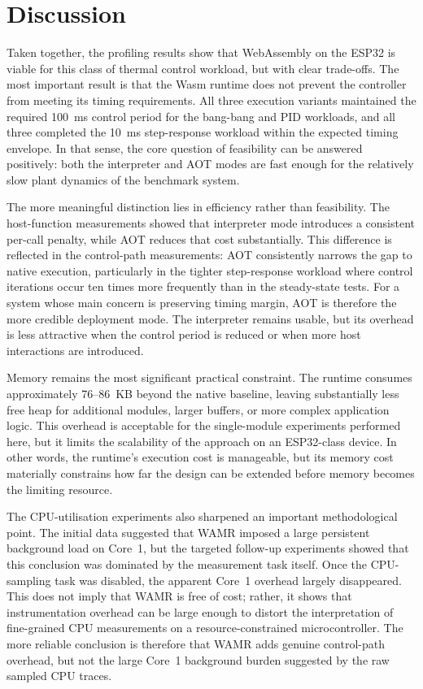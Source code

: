 \documentclass[12pt, a4paper]{report}
\begin{document}
\section{Discussion}

Taken together, the profiling results show that WebAssembly on the ESP32 is viable for this class of thermal control workload, but with clear trade-offs. The most important result is that the Wasm runtime does not prevent the controller from meeting its timing requirements. All three execution variants maintained the required 100~ms control period for the bang-bang and PID workloads, and all three completed the 10~ms step-response workload within the expected timing envelope. In that sense, the core question of feasibility can be answered positively: both the interpreter and AOT modes are fast enough for the relatively slow plant dynamics of the benchmark system.

The more meaningful distinction lies in efficiency rather than feasibility. The host-function measurements showed that interpreter mode introduces a consistent per-call penalty, while AOT reduces that cost substantially. This difference is reflected in the control-path measurements: AOT consistently narrows the gap to native execution, particularly in the tighter step-response workload where control iterations occur ten times more frequently than in the steady-state tests. For a system whose main concern is preserving timing margin, AOT is therefore the more credible deployment mode. The interpreter remains usable, but its overhead is less attractive when the control period is reduced or when more host interactions are introduced.

Memory remains the most significant practical constraint. The runtime consumes approximately 76--86~KB beyond the native baseline, leaving substantially less free heap for additional modules, larger buffers, or more complex application logic. This overhead is acceptable for the single-module experiments performed here, but it limits the scalability of the approach on an ESP32-class device. In other words, the runtime's execution cost is manageable, but its memory cost materially constrains how far the design can be extended before memory becomes the limiting resource.

The CPU-utilisation experiments also sharpened an important methodological point. The initial data suggested that WAMR imposed a large persistent background load on Core~1, but the targeted follow-up experiments showed that this conclusion was dominated by the measurement task itself. Once the CPU-sampling task was disabled, the apparent Core~1 overhead largely disappeared. This does not imply that WAMR is free of cost; rather, it shows that instrumentation overhead can be large enough to distort the interpretation of fine-grained CPU measurements on a resource-constrained microcontroller. The more reliable conclusion is therefore that WAMR adds genuine control-path overhead, but not the large Core~1 background burden suggested by the raw sampled CPU traces.
\end{document}
